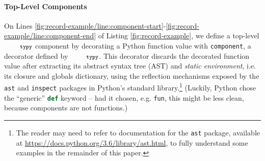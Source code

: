 \documentclass[10pt]{sigplanconf}
\newcommand{\typy}{\texttt{\footnotesize typy}}
\newcommand{\lip}[1]{\lstinline[language=Python,basicstyle=\ttfamily\footnotesize,morekeywords={with},deletendkeywords={tuple,buffer,map}]{#1}}
\newcommand{\li}[1]{\lip{#1}}
\begin{document}



\paragraph{Top-Level Components}
On Lines \ref{fig:record-example/line:component-start}-\ref{fig:record-example/line:component-end} of Listing \ref{fig:record-example}, we define a top-level $\typy$ component by decorating a Python function value with \lip{component}, a decorator defined by $\typy$. 
This decorator discards the decorated function value  after extracting its abstract syntax tree (AST) and \emph{static environment}, i.e. its closure and globals dictionary, using the reflection mechanisms exposed by the \lip{ast} and \lip{inspect}  packages in Python's standard library.\footnote{The reader may need to refer to  documentation for the \lip{ast} package, available at \url{https://docs.python.org/3.6/library/ast.html}, to fully understand some examples in the remainder of this paper.} (Luckily, Python chose the ``generic'' \li{def} keyword -- had it chosen, e.g. \li{fun}, this might be less clean, because components are not functions.)
\end{document}
